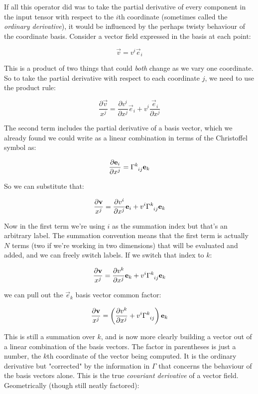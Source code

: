 If all this operator did was to take the partial derivative of every component in the input tensor with respect to the $i$th coordinate (sometimes called the \textit{ordinary derivative}), it would be influenced by the perhaps twisty behaviour of the coordinate basis. Consider a vector field expressed in the basis at each point:

$$
\vec{v} = v^i \vec{e}_i
$$

This is a product of two things that could \textit{both} change as we vary one coordinate. So to take the partial derivative with respect to each coordinate $j$, we need to use the product rule:

$$
\frac{\partial \vec{v}}{x^j} 
= \frac{\partial v^i}{\partial x^j} \vec{e}_i
+ v^i\frac{\vec{e}_i}{\partial x^j}
$$

The second term includes the partial derivative of a basis vector, which we already found we could write as a linear combination in terms of the Christoffel symbol as:

$$
\frac{\partial \vec{e}_i}{\partial x^j}
= \Gamma\indices{^k_i_j} \vec{e}_k
$$

So we can substitute that:

$$
\frac{\partial \vec{v}}{x^j} 
= \frac{\partial v^i}{\partial x^j} \vec{e}_i
+ v^i \Gamma\indices{^k_i_j} \vec{e}_k
$$

Now in the first term we're using $i$ as the summation index but that's an arbitrary label. The summation convention means that the first term is actually $N$ terms (two if we're working in two dimensions) that will be evaluated and added, and we can freely switch labels. If we switch that index to $k$:

$$
\frac{\partial \vec{v}}{x^j} 
= \frac{\partial v^k}{\partial x^j} \vec{e}_k
+ v^i \Gamma\indices{^k_i_j} \vec{e}_k
$$

we can pull out the $\vec{e}_k$ basis vector common factor:

$$
\frac{\partial \vec{v}}{x^j} 
= \left(
  \frac{\partial v^k}{\partial x^j}
  + v^i \Gamma\indices{^k_i_j} 
\right)
\vec{e}_k
$$

This is still a summation over $k$, and is now more clearly building a vector out of a linear combination of the basis vectors. The factor in parentheses is just a number, the $k$th coordinate of the vector being computed. It is the ordinary derivative but "corrected" by the information in $\Gamma$ that concerns the behaviour of the basis vectors alone. This is the true \textit{covariant derivative} of a vector field. Geometrically (though still neatly factored):

